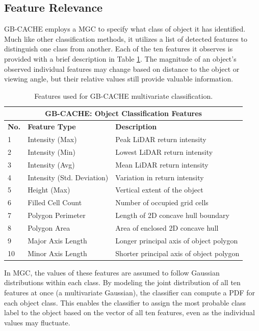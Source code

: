 \documentclass{erauthesis}
\begin{document}
\subsection{Feature Relevance} \label{gbcache_features}

GB-CACHE employs a \acl{MGC} to specify what class of object it has identified. 
Much like other classification methods, it utilizes a list of detected features to distinguish one class from another.
Each of the ten features it observes is provided with a brief description in Table \ref{tab:gbcache_features}.
The magnitude of an object's observed individual features may change based on distance to the object or viewing angle, but their relative values still provide valuable information.

\begin{table}[htbp]
\centering
\begin{tabular}{lll}
\hline
\multicolumn{3}{c}{GB-CACHE: Object Classification Features}\\
\hline
\hline
\textbf{No.} & \textbf{Feature Type} & \textbf{Description} \\ 
\hline
1 & Intensity (Max) & Peak LiDAR return intensity \\
2 & Intensity (Min) & Lowest LiDAR return intensity \\
3 & Intensity (Avg) & Mean LiDAR return intensity \\
4 & Intensity (Std. Deviation) & Variation in return intensity \\
5 & Height (Max) & Vertical extent of the object \\
6 & Filled Cell Count & Number of occupied grid cells \\
7 & Polygon Perimeter & Length of 2D concave hull boundary \\
8 & Polygon Area & Area of enclosed 2D concave hull \\
9 & Major Axis Length & Longer principal axis of object polygon \\
10 & Minor Axis Length & Shorter principal axis of object polygon \\
\hline
\end{tabular}
\caption{Features used for GB-CACHE multivariate classification.}
\label{tab:gbcache_features}
\end{table}

In \ac{MGC}, the values of these features are assumed to follow Gaussian distributions within each class.
By modeling the joint distribution of all ten features at once (a multivariate Gaussian), the classifier can compute a \acl{PDF} for each object class.
This enables the classifier to assign the most probable class label to the object based on the vector of all ten features, even as the individual values may fluctuate.
\end{document}
